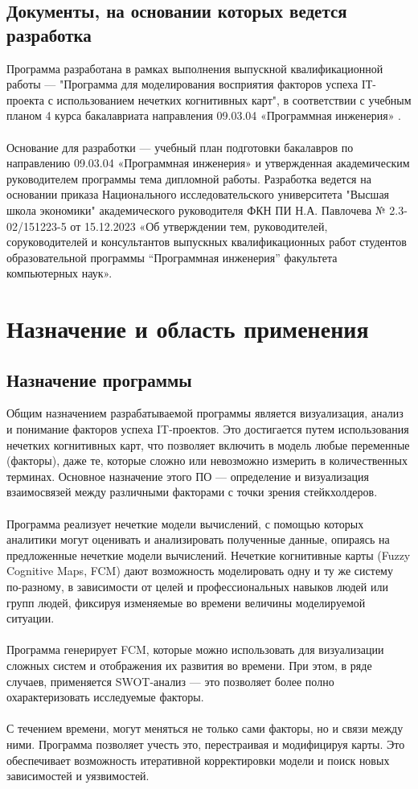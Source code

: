 \documentclass{article}
\begin{document}
    \subsection {Документы, на основании которых ведется разработка}
    Программа разработана в рамках выполнения выпускной квалификационной работы — "{}Программа для моделирования восприятия факторов успеха IТ-проекта с использованием нечетких когнитивных карт"{}, в соответствии с учебным планом 4 курса бакалавриата направления 09.03.04 «Программная инженерия» \cite{litlink10}.\\
    ~\\
    Основание для разработки — учебный план подготовки бакалавров по направлению 09.03.04 «Программная инженерия» \cite{litlink11} и утвержденная академическим руководителем программы тема дипломной работы. Разработка ведется на основании приказа Национального исследовательского университета "{}Высшая школа экономики"{} академического руководителя ФКН ПИ Н.А. Павлочева № 2.3-02/151223-5 от 15.12.2023 «Об утверждении тем, руководителей, соруководителей и консультантов выпускных квалификационных работ студентов образовательной программы “Программная инженерия” факультета компьютерных наук».
    \newpage
    \section {Назначение и область применения}
    \subsection {Назначение программы}
    Общим назначением разрабатываемой программы является визуализация, анализ и понимание факторов успеха IT-проектов. Это достигается путем использования нечетких когнитивных карт, что позволяет включить в модель любые переменные (факторы), даже те, которые сложно или невозможно измерить в количественных терминах. Основное назначение этого ПО — определение и визуализация взаимосвязей между различными факторами с точки зрения стейкхолдеров.\\
    ~\\
    Программа реализует нечеткие модели вычислений, с помощью которых аналитики могут оценивать и анализировать полученные данные, опираясь на предложенные нечеткие модели вычислений. Нечеткие когнитивные карты (Fuzzy Cognitive Maps, FCM) дают возможность моделировать одну и ту же систему по-разному, в зависимости от целей и профессиональных навыков людей или групп людей, фиксируя изменяемые во времени величины моделируемой ситуации.\\
    ~\\
    Программа генерирует FCM, которые можно использовать для визуализации сложных систем и отображения их развития во времени. При этом, в ряде случаев, применяется SWOT-анализ — это позволяет более полно охарактеризовать исследуемые факторы.\\
    ~\\
    С течением времени, могут меняться не только сами факторы, но и связи между ними. Программа позволяет учесть это, перестраивая и модифицируя карты. Это обеспечивает возможность итеративной корректировки модели и поиск новых зависимостей и уязвимостей.\\
\end{document}
